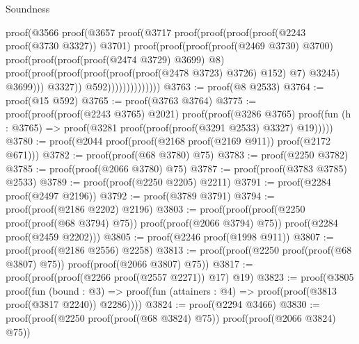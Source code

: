 \begin{lexlean}{Soundness}
\begin{coremodule}
                                      proof(@3566
                                          proof(@3657
                                              proof(@3717
                                                  proof(proof(proof(proof(@2243 proof(@3730 @3327))
                                                          @3701)
                                                        proof(proof(proof(proof(@2469 @3730) @3700)
                                                              proof(proof(proof(proof(@2474 @3729)
                                                                      @3699)
                                                                    @8)
                                                                  proof(proof(proof(proof(proof(proof(@2478
                                                                                @3723)
                                                                              @3726)
                                                                            @152)
                                                                          @7)
                                                                        @3245)
                                                                      @3699)))
                                                            @3327))
                                                      @592))))))))))))))
@3763 := proof(@8 @2533)
@3764 := proof(@15 @592)
@3765 := proof(@3763 @3764)
@3775 := proof(proof(proof(@2243 @3765) @2021)
      proof(proof(@3286 @3765)
          proof(fun (h : @3765) => proof(@3281 proof(proof(proof(@3291 @2533) @3327) @19)))))
@3780 := proof(@2044 proof(proof(@2168 proof(@2169 @911)) proof(@2172 @671)))
@3782 := proof(proof(@68 @3780) @75)
@3783 := proof(@2250 @3782)
@3785 := proof(proof(@2066 @3780) @75)
@3787 := proof(proof(@3783 @3785) @2533)
@3789 := proof(proof(@2250 @2205) @2211)
@3791 := proof(@2284 proof(@2497 @2196))
@3792 := proof(@3789 @3791)
@3794 := proof(proof(@2186 @2202) @2196)
@3803 := proof(proof(proof(@2250 proof(proof(@68 @3794) @75)) proof(proof(@2066 @3794) @75))
      proof(@2284 proof(@2459 @2202)))
@3805 := proof(@2246 proof(@1998 @911))
@3807 := proof(proof(@2186 @2556) @2258)
@3813 := proof(proof(@2250 proof(proof(@68 @3807) @75)) proof(proof(@2066 @3807) @75))
@3817 := proof(proof(proof(@2266 proof(@2557 @2271)) @17) @19)
@3823 := proof(@3805
      proof(fun (bound : @3) =>
        proof(fun (attainers : @4) => proof(proof(@3813 proof(@3817 @2240)) @2286))))
@3824 := proof(@2294 @3466)
@3830 := proof(proof(@2250 proof(proof(@68 @3824) @75)) proof(proof(@2066 @3824) @75))

\end{coremodule}
\end{lexlean}
